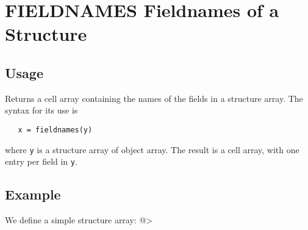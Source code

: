 \section{FIELDNAMES Fieldnames of a Structure}

\subsection{Usage}

Returns a cell array containing the names of the fields in
a structure array.  The syntax for its use is
\begin{verbatim}
   x = fieldnames(y)
\end{verbatim}
where \verb|y| is a structure array of object array.  The result
is a cell array, with one entry per field in \verb|y|.
\subsection{Example}

We define a simple structure array:
@>
